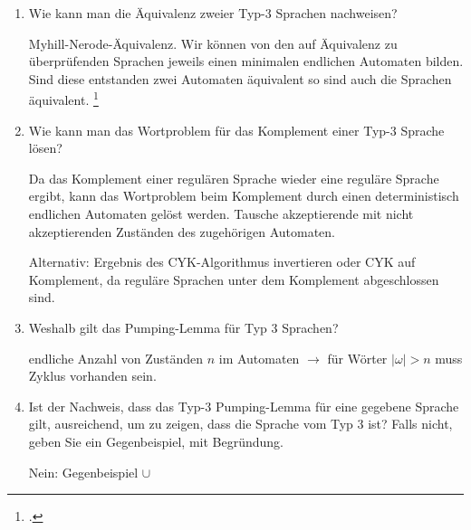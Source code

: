 \documentclass{lehramt-informatik-aufgabe}
\begin{document}
\begin{enumerate}
\begin{liAntwort}

\footcite{wiki:mehrdeutig}
\end{liAntwort}


\item Wie kann man die Äquivalenz zweier Typ-3 Sprachen nachweisen?

\begin{liAntwort}
Myhill-Nerode-Äquivalenz.
Wir können von den auf Äquivalenz zu überprüfenden Sprachen jeweils
einen minimalen endlichen Automaten bilden. Sind diese entstanden zwei
Automaten äquivalent so sind auch die Sprachen äquivalent.
\footcite{wiki:aequivalenzproblem}
\end{liAntwort}


\item Wie kann man das Wortproblem für das Komplement einer Typ-3
Sprache lösen?

\begin{liAntwort}
Da das Komplement einer regulären Sprache wieder eine reguläre Sprache
ergibt, kann das Wortproblem beim Komplement durch einen deterministisch
endlichen Automaten gelöst werden. Tausche akzeptierende mit nicht
akzeptierenden Zuständen des zugehörigen Automaten.

Alternativ: Ergebnis des CYK-Algorithmus invertieren oder CYK auf
Komplement, da reguläre Sprachen unter dem Komplement abgeschlossen
sind.
\end{liAntwort}


\item Weshalb gilt das Pumping-Lemma für Typ 3 Sprachen?

\begin{liAntwort}
endliche Anzahl von Zuständen $n$ im Automaten $\rightarrow$ für Wörter
$|\omega| > n$ muss Zyklus vorhanden sein.
\end{liAntwort}


\item Ist der Nachweis, dass das Typ-3 Pumping-Lemma für eine gegebene
Sprache gilt, ausreichend, um zu zeigen, dass die Sprache vom Typ 3 ist?
Falls nicht, geben Sie ein Gegenbeispiel, mit Begründung.

\begin{liAntwort}
Nein: Gegenbeispiel  $\cup$ 
\end{liAntwort}


\end{enumerate}
\end{document}
